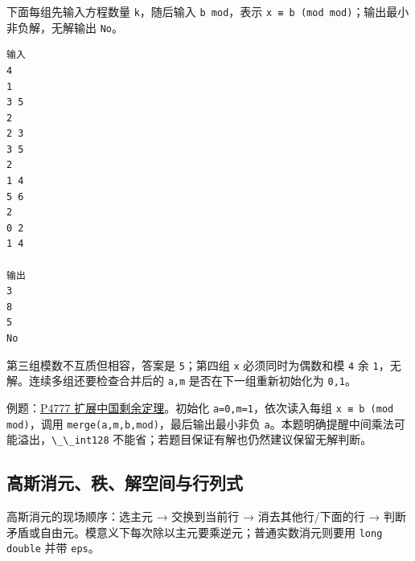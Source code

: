 下面每组先输入方程数量 \passthrough{\lstinline!k!}，随后输入 \passthrough{\lstinline!b mod!}，表示 \passthrough{\lstinline!x ≡ b (mod mod)!}；输出最小非负解，无解输出 \passthrough{\lstinline!No!}。

\begin{lstlisting}
输入
4
1
3 5
2
2 3
3 5
2
1 4
5 6
2
0 2
1 4

输出
3
8
5
No
\end{lstlisting}

第三组模数不互质但相容，答案是 \passthrough{\lstinline!5!}；第四组 \passthrough{\lstinline!x!} 必须同时为偶数和模 \passthrough{\lstinline!4!} 余 \passthrough{\lstinline!1!}，无解。连续多组还要检查合并后的 \passthrough{\lstinline!a,m!} 是否在下一组重新初始化为 \passthrough{\lstinline!0,1!}。

例题：\href{https://www.luogu.com.cn/problem/P4777}{P4777 扩展中国剩余定理}。初始化 \passthrough{\lstinline!a=0,m=1!}，依次读入每组 \passthrough{\lstinline!x ≡ b (mod mod)!}，调用 \passthrough{\lstinline!merge(a,m,b,mod)!}，最后输出最小非负 \passthrough{\lstinline!a!}。本题明确提醒中间乘法可能溢出，\passthrough{\lstinline!\_\_int128!} 不能省；若题目保证有解也仍然建议保留无解判断。


\subsection{高斯消元、秩、解空间与行列式}

高斯消元的现场顺序：选主元 → 交换到当前行 → 消去其他行/下面的行 → 判断矛盾或自由元。模意义下每次除以主元要乘逆元；普通实数消元则要用 \passthrough{\lstinline!long double!} 并带 \passthrough{\lstinline!eps!}。

